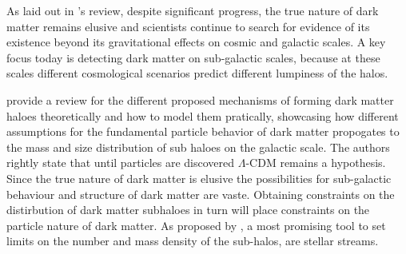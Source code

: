 \documentclass[draft]{aa}
\begin{document}
  As laid out in \citet{2021PrPNP.11903865A}'s review, despite significant progress, the true nature of dark matter remains elusive and scientists continue to search for evidence of its existence beyond its gravitational effects on cosmic and galactic scales. A key focus today is detecting dark matter on sub-galactic scales, because at these scales different cosmological scenarios predict different lumpiness of the halos.
    
  \citet{2019Galax...7...81Z} provide a review for the different proposed mechanisms of forming dark matter haloes theoretically and how to model them pratically, showcasing how different assumptions for the fundamental particle behavior of dark matter propogates to the mass and size distribution of sub haloes on the galactic scale. The authors rightly state that until particles are discovered $\Lambda$-CDM remains a hypothesis. Since the true nature of dark matter is elusive the possibilities for sub-galactic behaviour and structure of dark matter are vaste. Obtaining constraints on the distirbution of dark matter subhaloes in turn will place constraints on the particle nature of dark matter. As proposed by \citet{2012ApJ...748...20C}, a most promising tool to set limits on the number and mass density of the sub-halos, are stellar streams. 
\end{document}
